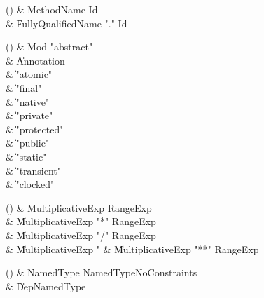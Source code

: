 \begin{bbgrammarappendix}{4.0in}

() & MethodName \label{prod:MethodName}  \: Id  \\

 &    \| FullyQualifiedName \xcd"." Id \\

\end{bbgrammarappendix}

\begin{bbgrammarappendix}{4.7in}

() & Mod \label{prod:Mod}  \: \xcd"abstract"  \\

 &    \| Annotation \\
 &    \| \xcd"atomic" \\
 &    \| \xcd"final" \\
 &    \| \xcd"native" \\
 &    \| \xcd"private" \\
 &    \| \xcd"protected" \\
 &    \| \xcd"public" \\
 &    \| \xcd"static" \\
 &    \| \xcd"transient" \\
 &    \| \xcd"clocked" \\

\end{bbgrammarappendix}

\begin{bbgrammarappendix}{3.3in}

() & MultiplicativeExp \label{prod:MultiplicativeExp}  \: RangeExp  \\

 &    \| MultiplicativeExp \xcd"*" RangeExp \\
 &    \| MultiplicativeExp \xcd"/" RangeExp \\
 &    \| MultiplicativeExp \xcd"%
 &    \| MultiplicativeExp \xcd"**" RangeExp \\

\end{bbgrammarappendix}

\begin{bbgrammarappendix}{4.1in}

() & NamedType \label{prod:NamedType}  \: NamedTypeNoConstraints  \\

 &    \| DepNamedType \\

\end{bbgrammarappendix}

